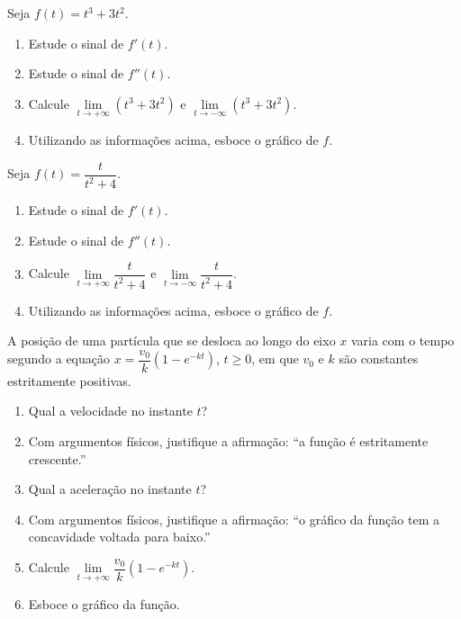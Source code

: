 \begin{exercicio}[7]
\label{ex:7.15.7}
Seja $f(t) = t^3 + 3t^2$.
\begin{enumerate}[label=\alph*)]
    \item Estude o sinal de $f'(t)$.
    \item Estude o sinal de $f''(t)$.
    \item Calcule $\lim\limits_{t \to +\infty} (t^3 + 3t^2)$ e $\lim\limits_{t \to -\infty} (t^3 + 3t^2)$.
    \item Utilizando as informações acima, esboce o gráfico de $f$.
\end{enumerate}
\end{exercicio}

\begin{exercicio}[8]
\label{ex:7.15.8}
Seja $f(t) = \dfrac{t}{t^2 + 4}$.
\begin{enumerate}[label=\alph*)]
    \item Estude o sinal de $f'(t)$.
    \item Estude o sinal de $f''(t)$.
    \item Calcule $\lim\limits_{t \to +\infty} \dfrac{t}{t^2 + 4}$ e $\lim\limits_{t \to -\infty} \dfrac{t}{t^2 + 4}$.
    \item Utilizando as informações acima, esboce o gráfico de $f$.
\end{enumerate}
\end{exercicio}

\begin{exercicio}[9]
\label{ex:7.15.9}
A posição de uma partícula que se desloca ao longo do eixo $x$ varia com o tempo segundo a equação $x = \dfrac{v_0}{k}(1 - e^{-kt})$, $t \ge 0$, em que $v_0$ e $k$ são constantes estritamente positivas.
\begin{enumerate}[label=\alph*)]
    \item Qual a velocidade no instante $t$?
    \item Com argumentos físicos, justifique a afirmação: ``a função é estritamente crescente.''
    \item Qual a aceleração no instante $t$?
    \item Com argumentos físicos, justifique a afirmação: ``o gráfico da função tem a concavidade voltada para baixo.''
    \item Calcule $\lim\limits_{t \to +\infty} \dfrac{v_0}{k}(1 - e^{-kt})$.
    \item Esboce o gráfico da função.
\end{enumerate}
\end{exercicio}

